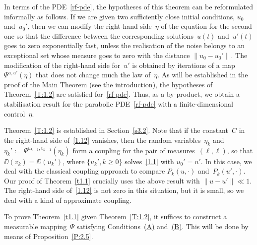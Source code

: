 \begin{remark}
In terms of the PDE~\eqref{rf-pde}, the hypotheses of this theorem can be reformulated informally as follows. If we are given two sufficiently close initial conditions, $u_0$ and~$u_0'$, then we can modify the right-hand side~$\eta$ of the equation for the second one so that the difference between the corresponding solutions~$u(t)$ and~$u'(t)$ goes to zero exponentially fast, unless the realisation of the noise belongs to an exceptional set whose measure goes to zero with the distance $\|u_0-u_0'\|$. The modification of the right-hand side for~$u'$ is obtained by iterations of a map $\Psi^{u,u'}(\eta)$ that does not change much the law of~$\eta$. As will be established in the proof of the Main Theorem (see the introduction), the hypotheses of Theorem~\ref{T:1.2} are satisfied for~\eqref{rf-pde}. Thus, as a by-product, we obtain a stabilisation result for the parabolic PDE~\eqref{rf-pde} with a finite-dimensional control~$\eta$.
\end{remark}

Theorem~\ref{T:1.2} is established in Section~\ref{s3.2}. Note that if the constant~$C$ in the right-hand side of~\eqref{1.12} vanishes, then the random variables~$\eta_k$ and $\eta_k':=\varPsi^{u_{k-1},v_{k-1}}(\eta_k)$ form a coupling for the pair of measures~$(\ell,\ell)$, so that $\DD(v_k)\!=\!\DD(u_k')$, where \hbox{$\{u_k',k\!\ge\!0\}$} solves~\eqref{1.1} with $u_0'=u'$. In this case, we deal with the classical coupling approach to compare $P_k(u,\cdot)$ and~$P_k(u',\cdot)$. Our proof of Theorem~\ref{t1.1} crucially uses the above result with $\|u-u'\|\ll1$. The right-hand side of~\eqref{1.12} is not zero in this situation, but it is small, so we deal with a kind of approximate coupling.

To prove Theorem~\ref{t1.1} given Theorem~\ref{T:1.2}, it suffices to construct a measurable mapping~$\varPsi$ satisfying Conditions~\hyperlink{(A)}{(A)} and~\hyperlink{(B)}{(B)}. This will be done by means of Proposition~\ref{P:2.5}.

